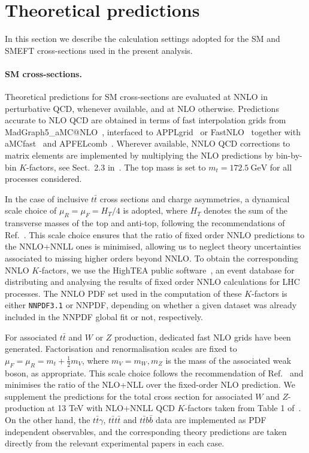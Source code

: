 \documentclass[withindex,glossary]{cam-thesis}
\begin{document}
\section{Theoretical predictions}
\label{sec:theory}

In this section we describe the calculation settings adopted
for the SM and SMEFT cross-sections used in the present analysis.

\paragraph{SM cross-sections.}
%
Theoretical predictions for SM cross-sections are evaluated at NNLO in perturbative QCD, whenever
available, and at NLO otherwise.
%
Predictions accurate to NLO QCD are obtained in terms of fast interpolation grids from {\sc\small MadGraph5\_aMC@NLO}~\cite{Frederix:2018nkq,Alwall:2014hca}, 
interfaced to {\sc\small APPLgrid}~\cite{Carli:2010rw} or {\sc\small FastNLO}~\cite{Kluge:2006xs,Wobisch:2011ij,Britzger:2012bs} together 
with {\sc\small aMCfast}~\cite{Bertone:2014zva} and {\sc\small APFELcomb}~\cite{Bertone:2016lga}.
%
Wherever available, NNLO QCD corrections to matrix elements are  implemented  by multiplying the NLO predictions by bin-by-bin $K$-factors, see Sect.~2.3 in~\cite{Ball:2014uwa}.
%
The top mass is set to $m_t = 172.5\ \text{GeV}$ for all processes considered.

In the case of inclusive $t\bar{t}$ cross sections and charge asymmetries,
a dynamical scale choice of $\mu_R = \mu_F = H_T/4$
is adopted, where $H_T$ denotes the sum of the transverse masses of the top and anti-top,
following the recommendations of Ref.~\cite{Czakon:2016dgf}.
%
This scale choice ensures that
the ratio of fixed order NNLO predictions to the NNLO+NNLL ones is minimised,
allowing us to neglect theory uncertainties associated to missing higher orders beyond NNLO. 
%
To obtain the corresponding
NNLO $K$-factors, we use the {\sc\small HighTEA} public software~\cite{hightea}, 
an event database for distributing and analysing the results of fixed order NNLO
calculations for LHC processes.
%
The NNLO PDF set used in the computation of these $K$-factors is either 
{\tt NNPDF3.1} or NNPDF, depending on whether a given dataset was already included
in the NNPDF global fit or not, respectively.

For associated $t\bar{t}$ and $W$ or $Z$ production, dedicated fast NLO grids  have been generated.
%
Factorisation and renormalisation scales are fixed to $\mu_F = \mu_R = m_t + \frac{1}{2}m_V$, where $m_V = m_W, m_Z$ is the mass of the associated weak boson,
as appropriate.
%
This scale choice follows the recommendation of Ref.~\cite{Kulesza:2018tqz} and minimises the ratio of the NLO+NLL over the fixed-order NLO prediction.
%
We supplement the predictions for the total cross section for associated $W$ and $Z$-production at 13 TeV with NLO+NNLL QCD $K$-factors taken from Table 1 of~\cite{Kulesza:2018tqz}.
%
On the other hand, the $t\bar{t}\gamma$, $t\bar{t}t\bar{t}$ and $t\bar{t}b\bar{b}$ data are implemented as PDF independent observables, and the corresponding theory predictions are taken directly from the relevant experimental papers in each case.
\end{document}

